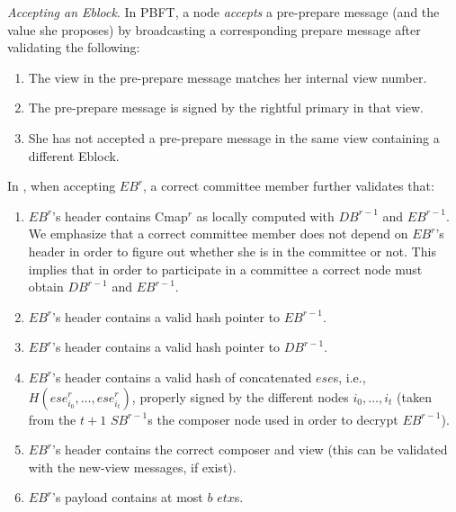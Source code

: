 \textit{Accepting an Eblock}. \label{Protocol:ValidateEB}
In PBFT, a node \emph{accepts} a pre-prepare message (and the value she proposes) by broadcasting a corresponding prepare message after validating the following: 
\begin{enumerate}
\item The view in the pre-prepare message matches her internal view number.
\item The pre-prepare message is signed by the rightful primary in that view.
\item She has not accepted a pre-prepare message in the same view containing a different Eblock.
\end{enumerate}

In \nameNS, when accepting $EB^r$, a correct committee member further validates that:
\begin{enumerate}
\item $EB^r$'s header contains Cmap$^r$ as locally computed with $DB^{r-1}$ and $EB^{r-1}$. We emphasize that a correct committee member does not depend on $EB^r$'s header in order to figure out whether she is in the committee or not. This implies that in order to participate in a committee a correct node must obtain $DB^{r-1}$ and $EB^{r-1}$.
\item $EB^r$'s header contains a valid hash pointer to $EB^{r-1}$.
\item $EB^r$'s header contains a valid hash pointer to $DB^{r-1}$.
\item $EB^r$'s header contains a valid hash of concatenated $ese$s, i.e., $H(ese^r_{i_0},\dots,ese^r_{i_{t}})$, properly signed by the different nodes $i_0,\dots,i_{t}$ (taken from the $t+1$ $SB^{r-1}$s the composer node used in order to decrypt $EB^{r-1}$).
\item $EB^r$'s header contains the correct composer and view (this can be validated with the new-view messages, if exist).
\item $EB^r$'s payload contains at most $b$ $etx$s.
\end{enumerate}

